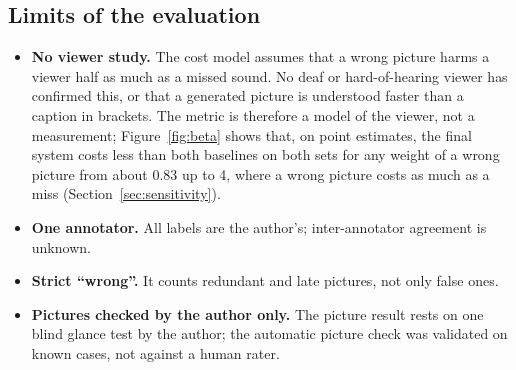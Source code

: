 \subsection{Limits of the evaluation}
\begin{itemize}
  \item \textbf{No viewer study.} The cost model assumes that a wrong picture harms a viewer half as much as a missed
        sound. No deaf or hard-of-hearing viewer has confirmed this, or that a generated picture is understood faster than
        a caption in brackets. The metric is therefore a model of the viewer, not a measurement;
        Figure~\ref{fig:beta} shows that, on point estimates, the final system costs less than both baselines on both sets for any
        weight of a wrong picture from about 0.83 up to 4, where a wrong picture costs as much as a miss (Section~\ref{sec:sensitivity}).
  \item \textbf{One annotator.} All labels are the author's; inter-annotator agreement is unknown.
  \item \textbf{Strict ``wrong''.} It counts redundant and late pictures, not only false ones.
  \item \textbf{Pictures checked by the author only.} The picture result rests on one blind glance test by the author; the
        automatic picture check was validated on known cases, not against a human rater.
\end{itemize}

